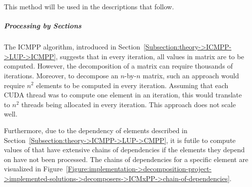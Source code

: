 This method will be used in the descriptions that follow.

\subparagraph{Processing by Sections} The ICMPP algorithm, introduced in Section~\ref{Subsection:theory->ICMPP->LUP->ICMPP}, suggests that in every iteration, all values in matrix  are to be computed. However, the decomposition of a matrix can require thousands of iterations. Moreover, to decompose an $n$-by-$n$ matrix, such an approach would require $n^2$ elements to be computed in every iteration. Assuming that each CUDA thread was to compute one element in an iteration, this would translate to $n^2$ threads being allocated in every iteration. This approach does not scale well.

Furthermore, due to the dependency of elements described in Section~\ref{Subsection:theory->ICMPP->LUP->CMPP}, it is futile to compute values of  that have extensive chains of dependencies if the elements they depend on have not been processed. The chains of dependencies for a specific element are visualized in Figure~\ref{Figure:implementation->decomposition-project->implemented-solutions->decomposers->ICMxPP->chain-of-dependencies}.

